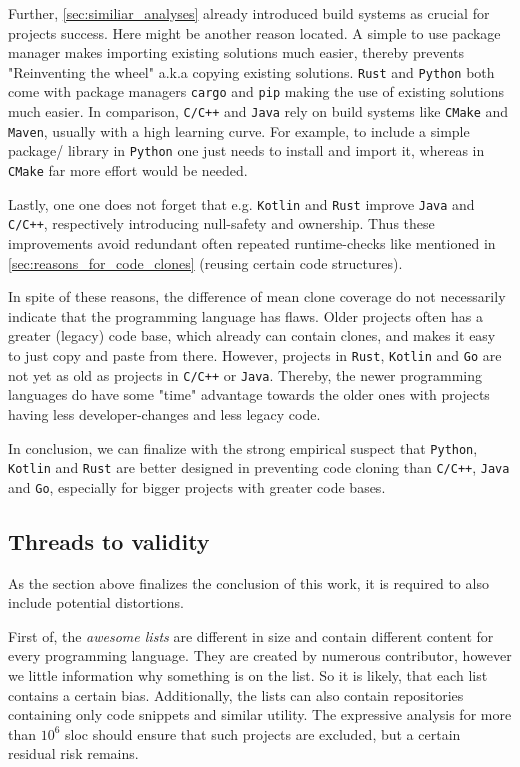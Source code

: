 Further, \autoref{sec:similiar_analyses} already introduced build systems as crucial for projects success. Here might be another reason located. A simple to use package manager makes importing existing solutions much easier, thereby prevents "Reinventing the wheel" a.k.a copying existing solutions. \texttt{Rust} and \texttt{Python} both come with package managers \texttt{cargo} and \texttt{pip} making the use of existing solutions much easier. In comparison, \texttt{C/C++} and \texttt{Java} rely on build systems like \texttt{CMake} and \texttt{Maven}, usually with a high learning curve. For example, to include a simple package/ library in \texttt{Python} one just needs to install and import it, whereas in \texttt{CMake} far more effort would be needed.

Lastly, one one does not forget that e.g. \texttt{Kotlin} and \texttt{Rust} improve \texttt{Java} and \texttt{C/C++}, respectively introducing null-safety and ownership. Thus these improvements avoid redundant often repeated runtime-checks like mentioned in \autoref{sec:reasons_for_code_clones} (reusing certain code structures).

In spite of these reasons, the difference of mean clone coverage do not necessarily indicate that the programming language has flaws.
Older projects often has a greater (legacy) code base, which already can contain clones, and makes it easy to just copy and paste from there. However, projects in \texttt{Rust}, \texttt{Kotlin} and \texttt{Go} are not yet as old as projects in \texttt{C/C++} or \texttt{Java}. Thereby, the newer programming languages do have some "time" advantage towards the older ones with projects having less developer-changes and less legacy code.

In conclusion, we can finalize with the strong empirical suspect that \texttt{Python}, \texttt{Kotlin} and \texttt{Rust} are better designed in preventing code cloning than \texttt{C/C++}, \texttt{Java} and \texttt{Go}, especially for bigger projects with greater code bases.

 
\subsection{Threads to validity}

As the section above finalizes the conclusion of this work, it is required to also include potential distortions.

First of, the \textit{awesome lists} are different in size and contain different content for every programming language. They are created by numerous contributor, however we little information why something is on the list. So it is likely, that each list contains a certain bias. Additionally, the lists can also contain repositories containing only code snippets and similar utility. The expressive analysis for more than $10^6$ \ac{sloc} should ensure that such projects are excluded, but a certain residual risk remains.

